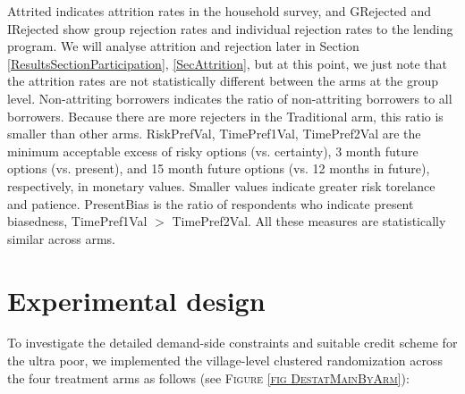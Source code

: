 	\textsf{Attrited} indicates attrition rates in the household survey, and \textsf{GRejected} and \textsf{IRejected} show group rejection rates and individual rejection rates to the lending program. We will analyse attrition and rejection later in Section \ref{ResultsSectionParticipation}, \ref{SecAttrition}, but at this point, we just note that the attrition rates are not statistically different between the arms at the group level. \textsf{Non-attriting borrowers} indicates the ratio of non-attriting borrowers to all borrowers. Because there are more rejecters in the \textsf{Traditional} arm, this ratio is smaller than other arms. \textsf{RiskPrefVal, TimePref1Val, TimePref2Val} are the minimum acceptable excess of risky options (vs. certainty), 3 month future options (vs. present), and 15 month future options (vs. 12 months in future), respectively, in monetary values. \label{StudySamplePrefDescription} Smaller values indicate greater risk torelance and patience. \textsf{PresentBias} is the ratio of respondents who indicate present biasedness, \textsf{TimePref1Val} $>$ \textsf{TimePref2Val}. All these measures are statistically similar across arms.


\section{Experimental design}
\label{SecExperimentalDesign}


	To investigate the detailed demand-side constraints and suitable credit scheme for the ultra poor, we implemented the village-level clustered randomization across the four treatment arms as follows (see \textsc{\normalsize Figure \ref{fig DestatMainByArm}}):


